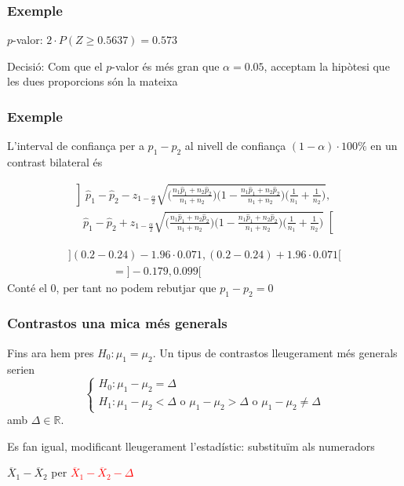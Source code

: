 \documentclass[12pt,t]{beamer}
\newcommand{\red}[1]{\textcolor{red}{#1}}
\renewcommand{\emph}[1]{{\color{red}#1}}
\newcommand{\RR}{\mathbb{R}}
\renewcommand{\geq}{\geqslant}
\theoremstyle{plain}
\theoremstyle{definition}
\begin{document}
\begin{frame}
\frametitle{Exemple}

\emph{$p$-valor}: $2\cdot P(Z\geq 0.5637)=0.573$
\medskip

\emph{Decisió}: Com que el $p$-valor és més gran que $\alpha=0.05$, acceptam la hipòtesi que les dues proporcions són la mateixa

\end{frame}
\begin{frame}
\frametitle{Exemple}

L'\emph{interval de confiança} per a  $p_1-p_2$
al nivell de confiança $(1-\alpha)\cdot 100\%$ en un contrast bilateral és
{\small $$
\begin{array}{l}
\left]\widehat{p}_1-\widehat{p}_2-z_{1-\frac{\alpha}{2}}\sqrt{\Big(\frac{n_1 \widehat{p}_1 +n_2 \widehat{p}_2}{n_1
+n_2}\Big)\Big(1-\frac{n_1 \widehat{p}_1 +n_2 \widehat{p}_2}{n_1
+n_2}\Big)\Big(\frac{1}{n_1}+\frac{1}{n_2}
\Big)},\right.\\[2ex]
\quad
\left.\widehat{p}_1-\widehat{p}_2+z_{1-\frac{\alpha}{2}}\sqrt{\Big(\frac{n_1 \widehat{p}_1 +n_2 \widehat{p}_2}{n_1
+n_2}\Big)\Big(1-\frac{n_1 \widehat{p}_1 +n_2 \widehat{p}_2}{n_1
+n_2}\Big)\Big(\frac{1}{n_1}+\frac{1}{n_2}
\Big)}
\right[
\end{array}
$$

}
\pause\bigskip

$$
\begin{array}{l}
](0.2 -0.24)-1.96\cdot 0.071,(0.2 -0.24)+1.96\cdot 0.071[\\
\qquad\qquad =]-0.179,0.099[
\end{array}
$$
Conté el 0, per tant no podem rebutjar que $p_1-p_2=0$
\end{frame}


\begin{frame}
\frametitle{Contrastos una mica més generals}

Fins ara hem pres $H_0:\mu_1=\mu_2$. Un tipus de contrastos lleugerament més generals serien
$$
\left\{\begin{array}{l}
H_0:\mu_1-\mu_2=\Delta\\
H_1:\mu_1-\mu_2<\Delta\mbox{ o }\mu_1-\mu_2>\Delta\mbox{ o }\mu_1-\mu_2\neq\Delta
\end{array}\right.
$$
amb $\Delta\in \RR$.
\medskip

Es fan igual, modificant lleugerament l'estadístic: substituïm als numeradors
\begin{center}
$\overline{X}_1-\overline{X}_2$ per
\red{$\overline{X}_1-\overline{X}_2-\Delta$}
\end{center}


\end{frame}
\end{document}
